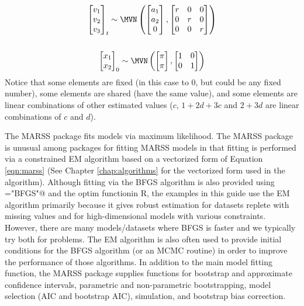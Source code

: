 \begin{gather*}
\begin{bmatrix}v_1\\ v_2\\ v_3\end{bmatrix}_t \sim \MVN\begin{pmatrix}\begin{bmatrix}a_1\\ a_2\\ 0\end{bmatrix},
 \begin{bmatrix}r&0&0\\0&r&0\\0&0&r\end{bmatrix} \end{pmatrix}  \\
\\
\begin{bmatrix}x_1\\ x_2\end{bmatrix}_0 \sim \MVN\begin{pmatrix}\begin{bmatrix}\pi\\ \pi\end{bmatrix},\begin{bmatrix}1&0\\ 0&1\end{bmatrix} \end{pmatrix}
\end{gather*}
Notice that some elements are fixed (in this case to 0, but could be any fixed number), some elements are shared (have the same value), and some elements are linear combinations of other estimated values ($c$, $1+2d+3c$ and $2+3d$ are linear combinations of $c$ and $d$).

The MARSS package fits models via maximum likelihood. The MARSS package is unusual among packages for fitting MARSS models in that fitting is performed via a constrained EM algorithm \citep{Holmes2010} based on a vectorized form of Equation \ref{eqn:marss} (See Chapter \ref{chap:algorithms} for the vectorized form used in the algorithm).  Although fitting via the BFGS algorithm is also provided using \verb@method="BFGS"@ and the optim functionin R, the examples in this guide use the EM algorithm primarily because it gives robust estimation for datasets replete with missing values and for high-dimensional models with various constraints. However, there are many models/datasets where BFGS is faster and we typically try both for problems.  The EM algorithm is also often used to provide initial conditions for the BFGS algorithm (or an MCMC routine) in order to improve the performance of those algorithms.  In addition to the main model fitting function, the MARSS package  supplies functions for bootstrap and approximate confidence intervals, parametric and non-parametric bootstrapping, model selection (AIC and bootstrap AIC), simulation, and bootstrap bias correction.

